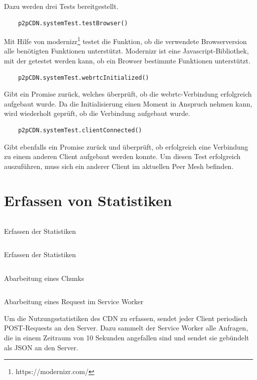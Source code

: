 Dazu werden drei Tests bereitgestellt.
\begin{lstlisting}
	p2pCDN.systemTest.testBrowser()
\end{lstlisting}
 Mit Hilfe von modernizr\footnote{https://modernizr.com/} testet die Funktion, ob die verwendete Browserversion alle benötigten Funktionen unterstützt. Modernizr ist eine Javascript-Bibliothek, mit der getestet werden kann, ob ein Browser bestimmte Funktionen unterstützt.
\begin{lstlisting}
	p2pCDN.systemTest.webrtcInitialized()
\end{lstlisting}
Gibt ein Promise zurück, welches überprüft, ob die webrtc-Verbindung erfolgreich aufgebaut wurde. Da die Initialisierung einen Moment in Anspruch nehmen kann, wird wiederholt geprüft, ob die Verbindung aufgebaut wurde.
\begin{lstlisting}
	p2pCDN.systemTest.clientConnected()
\end{lstlisting}
Gibt ebenfalls ein Promise zurück und überprüft, ob erfolgreich eine Verbindung zu einem anderen Client aufgebaut werden konnte. Um diesen Test erfolgreich auszuführen, muss sich ein anderer Client im aktuellen Peer Mesh befinden.

\section{Erfassen von Statistiken}\label{ch:implementation:stats}
\begin{listing}[h]
	\inputminted{javascript}{listings/sendStatistic.js}
	\caption{Erfassen der Statistiken}
	\label{lst:code-stats}
\end{listing}
\begin{listing}[h]
	\inputminted{javascript}{listings/logStatistic.js}
	\caption{Erfassen der Statistiken}
	\label{lst:code-stats}
\end{listing}

\begin{listing}[h]
	\inputminted{javascript}{listings/_handle_chunk.js}
	\caption{Abarbeitung eines Chunks}
	\label{lst:handle_chunk}
\end{listing}

\begin{listing}[h]
	\inputminted{javascript}{listings/handle_request.js}
	\caption{Abarbeitung eines Request im Service Worker}
	\label{lst:handle_request}
\end{listing}

Um die Nutzungsstatistiken des CDN zu erfassen, sendet jeder Client periodisch POST-Requests an den Server. Dazu sammelt der Service Worker alle Anfragen, die in einem Zeitraum von 10 Sekunden angefallen sind und sendet sie gebündelt als JSON an den Server.

